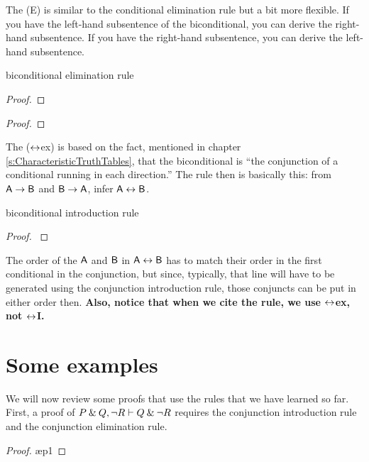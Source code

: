 The  ({\eiff}E) is similar to the conditional elimination rule but a bit more flexible. If you have the left-hand subsentence of the biconditional, you can derive the right-hand subsentence. If you have the right-hand subsentence, you can derive the left-hand subsentence.
\begin{factboxy}{biconditional elimination rule}
\begin{proof}
	 
\end{proof}

\begin{proof}
	 
\end{proof}
\end{factboxy}

The  ($\leftrightarrow$ex) is based on the fact, mentioned in chapter \ref{s:CharacteristicTruthTables}, that the biconditional is ``the conjunction of a conditional running in each direction.'' The rule then is basically this: from $\mathsf{A} \rightarrow \mathsf{B}$ and $\mathsf{B} \rightarrow \mathsf{A}$, infer $\mathsf{A} \leftrightarrow \mathsf{B}$.

\begin{factboxy}{biconditional introduction rule}
\begin{proof}\label{eiff-I}
	 
\end{proof}
\end{factboxy}

The order of the $\mathsf{A}$ and $\mathsf{B}$ in $\mathsf{A}\leftrightarrow\mathsf{B}$ has to match their order in the first conditional in the conjunction, but since, typically, that line will have to be generated using the conjunction introduction rule, those conjuncts  can be put in either order then. \textbf{Also, notice that when we cite the rule, we use $\leftrightarrow$ex, not $\leftrightarrow$I.}


\section{Some examples}

We will now review some proofs that use the rules that we have learned so far. First, a proof of $P \mathbin{\&} Q, {\neg} R \vdash Q \mathbin{\&} {\neg} R$ requires the conjunction introduction rule and the conjunction elimination rule.
\begin{proof}
	 \pr{}
	 \pr{}
	 \ae{p1}
	 
\end{proof}\medskip

